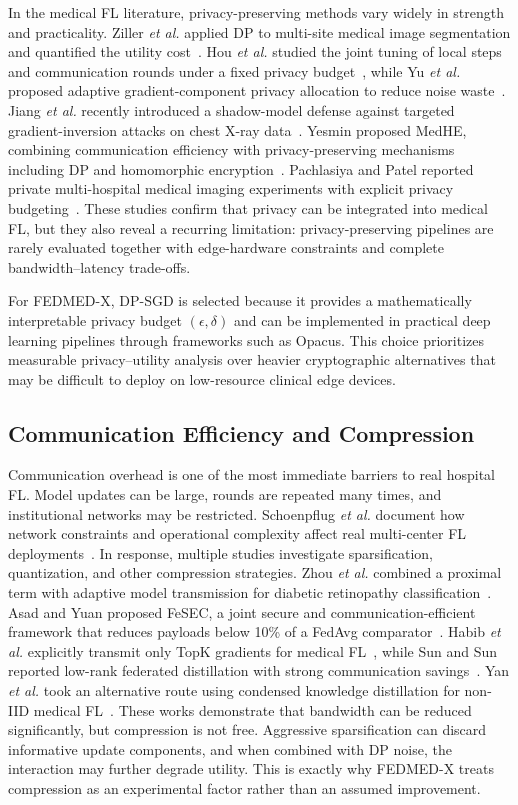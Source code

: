 In the medical FL literature, privacy-preserving methods vary widely in
strength and practicality. Ziller \emph{et al.} applied DP to multi-site
medical image segmentation and quantified the utility
cost~\cite{ziller2021differentially}. Hou \emph{et al.} studied the joint
tuning of local steps and communication rounds under a fixed privacy
budget~\cite{hou2023improving}, while Yu \emph{et al.} proposed adaptive
gradient-component privacy allocation to reduce noise
waste~\cite{yu2024adaptive}. Jiang \emph{et al.} recently introduced a
shadow-model defense against targeted gradient-inversion attacks on chest
X-ray data~\cite{jiang2025shadow}. Yesmin proposed MedHE, combining
communication efficiency with privacy-preserving mechanisms including DP and
homomorphic encryption~\cite{yesmin2025medhe}. Pachlasiya and Patel reported
private multi-hospital medical imaging experiments with explicit privacy
budgeting~\cite{pachlasiya2026fedhealth}. These studies confirm that privacy
can be integrated into medical FL, but they also reveal a recurring
limitation: privacy-preserving pipelines are rarely evaluated together with
edge-hardware constraints and complete bandwidth--latency trade-offs.

For FEDMED-X, DP-SGD is selected because it provides a mathematically
interpretable privacy budget $(\epsilon,\delta)$ and can be implemented in
practical deep learning pipelines through frameworks such as Opacus. This
choice prioritizes measurable privacy--utility analysis over heavier
cryptographic alternatives that may be difficult to deploy on low-resource
clinical edge devices.

\subsection{Communication Efficiency and Compression}
Communication overhead is one of the most immediate barriers to real hospital
FL. Model updates can be large, rounds are repeated many times, and
institutional networks may be restricted. Schoenpflug \emph{et al.} document
how network constraints and operational complexity affect real multi-center
FL deployments~\cite{schoenpflug2025navigating}. In response, multiple
studies investigate sparsification, quantization, and other compression
strategies. Zhou \emph{et al.} combined a proximal term with adaptive model
transmission for diabetic retinopathy classification~\cite{zhou2022communication}.
Asad and Yuan proposed FeSEC, a joint secure and communication-efficient
framework that reduces payloads below 10\% of a FedAvg
comparator~\cite{asad2024fesec}. Habib \emph{et al.} explicitly transmit only
TopK gradients for medical FL~\cite{habib2025cflsparsemed}, while Sun and Sun
reported low-rank federated distillation with strong communication
savings~\cite{sun2025medfd}. Yan \emph{et al.} took an alternative route
using condensed knowledge distillation for non-IID medical
FL~\cite{yan2024fedvck}. These works demonstrate that bandwidth can be
reduced significantly, but compression is not free. Aggressive sparsification
can discard informative update components, and when combined with DP noise,
the interaction may further degrade utility. This is exactly why FEDMED-X
treats compression as an experimental factor rather than an assumed
improvement.

